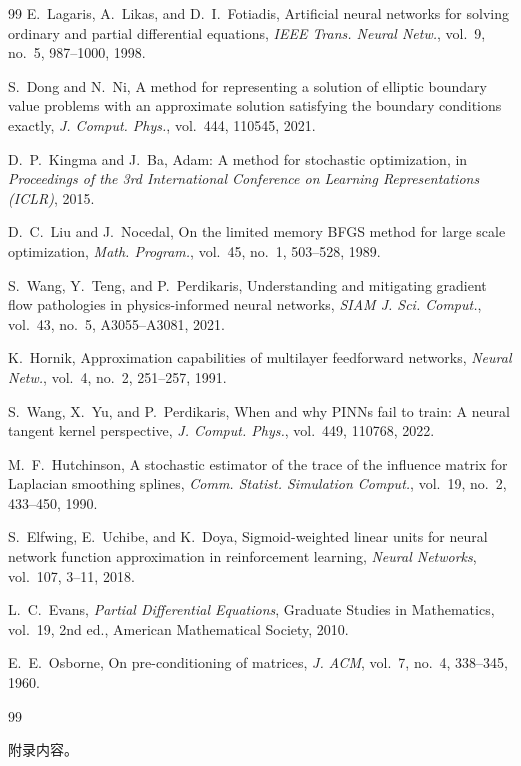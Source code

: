 \documentclass{xmu}
\theoremstyle{plain}
\theoremstyle{remark}
\begin{document}
\begin{reference}
\begin{thebibliography}{99}
    E.~Lagaris, A.~Likas, and D.~I.~Fotiadis,
    Artificial neural networks for solving ordinary and partial differential equations,
    \textit{IEEE Trans. Neural Netw.}, vol.~9, no.~5, 987--1000, 1998.

    S.~Dong and N.~Ni,
    A method for representing a solution of elliptic boundary value problems with an approximate solution satisfying the boundary conditions exactly,
    \textit{J. Comput. Phys.}, vol.~444, 110545, 2021.

    D.~P.~Kingma and J.~Ba,
    Adam: A method for stochastic optimization,
    in \textit{Proceedings of the 3rd International Conference on Learning Representations (ICLR)}, 2015.

    D.~C.~Liu and J.~Nocedal,
    On the limited memory BFGS method for large scale optimization,
    \textit{Math. Program.}, vol.~45, no.~1, 503--528, 1989.

    S.~Wang, Y.~Teng, and P.~Perdikaris,
    Understanding and mitigating gradient flow pathologies in physics-informed neural networks,
    \textit{SIAM J. Sci. Comput.}, vol.~43, no.~5, A3055--A3081, 2021.

    K.~Hornik,
    Approximation capabilities of multilayer feedforward networks,
    \textit{Neural Netw.}, vol.~4, no.~2, 251--257, 1991.

    S.~Wang, X.~Yu, and P.~Perdikaris,
    When and why PINNs fail to train: A neural tangent kernel perspective,
    \textit{J. Comput. Phys.}, vol.~449, 110768, 2022.

    M.~F.~Hutchinson,
    A stochastic estimator of the trace of the influence matrix for Laplacian smoothing splines,
    \textit{Comm. Statist. Simulation Comput.}, vol.~19, no.~2, 433--450, 1990.

    S.~Elfwing, E.~Uchibe, and K.~Doya,
    Sigmoid-weighted linear units for neural network function approximation in reinforcement learning,
    \textit{Neural Networks}, vol.~107, 3--11, 2018.

    L.~C.~Evans,
    \textit{Partial Differential Equations},
    Graduate Studies in Mathematics, vol.~19, 2nd ed., American Mathematical Society, 2010.

    E.~E.~Osborne,
    On pre-conditioning of matrices,
    \textit{J. ACM}, vol.~7, no.~4, 338--345, 1960.

    \end{thebibliography}{99}

    
\end{reference}


\begin{appendix}
    附录内容。
\end{appendix}

\end{document}
